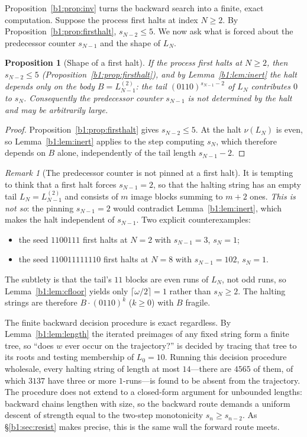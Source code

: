\documentclass[a4paper]{article}
\theoremstyle{plain}
\newtheorem{proposition}{Proposition}[subsection]
\theoremstyle{definition}
\theoremstyle{remark}
\newtheorem{remark}{Remark}[subsection]
\begin{document}
Proposition~\ref{b1:prop:inv} turns the backward search into a finite, exact computation. Suppose the process first halts at index $N\ge 2$. By Proposition~\ref{b1:prop:firsthalt}, $s_{N-2}\le 5$. We now ask what is forced about the predecessor counter $s_{N-1}$ and the shape of $L_N$.

\begin{proposition}[Shape of a first halt]\label{b1:prop:halt-corr}
If the process first halts at $N\ge 2$, then $s_{N-2}\le 5$ (Proposition~\ref{b1:prop:firsthalt}), and by Lemma~\ref{b1:lem:inert} the halt depends only on the body $B=L^{(2)}_{N-1}$: the tail $(0110)^{s_{N-1}-2}$ of $L_N$ contributes $0$ to $s_N$. Consequently the predecessor counter $s_{N-1}$ is not determined by the halt and may be arbitrarily large.
\end{proposition}
\begin{proof}
Proposition~\ref{b1:prop:firsthalt} gives $s_{N-2}\le 5$. At the halt $\nu(L_N)$ is even, so Lemma~\ref{b1:lem:inert} applies to the step computing $s_N$, which therefore depends on $B$ alone, independently of the tail length $s_{N-1}-2$.
\end{proof}

\begin{remark}[The predecessor counter is not pinned at a first halt]\label{b1:rem:rem-pinning}
It is tempting to think that a first halt forces $s_{N-1}=2$, so that the halting string has an empty tail $L_N=L^{(2)}_{N-1}$ and consists of $m$ image blocks summing to $m+2$ ones. \emph{This is not so}: the pinning $s_{N-1}=2$ would contradict Lemma~\ref{b1:lem:inert}, which makes the halt independent of $s_{N-1}$. Two explicit counterexamples:
\begin{itemize}
\item the seed $1100111$ first halts at $N=2$ with $s_{N-1}=3$, $s_N=1$;
\item the seed $110011111110$ first halts at $N=8$ with $s_{N-1}=102$, $s_N=1$.
\end{itemize}
The subtlety is that the tail's $11$ blocks are even runs of $L_N$, not odd runs, so Lemma~\ref{b1:lem:cfloor} yields only $\lceil\omega/2\rceil=1$ rather than $s_N\ge 2$. The halting strings are therefore $B\cdot(0110)^k$ ($k\ge 0$) with $B$ fragile.
\end{remark}

The finite backward decision procedure is exact regardless. By Lemma~\ref{b1:lem:length} the iterated preimages of any fixed string form a finite tree, so ``does $w$ ever occur on the trajectory?'' is decided by tracing that tree to its roots and testing membership of $L_0=10$. Running this decision procedure wholesale, every halting string of length at most $14$---there are $4565$ of them, of which $3137$ have three or more $1$-runs---is found to be absent from the trajectory. The procedure does not extend to a closed-form argument for unbounded lengths: backward chains lengthen with size, so the backward route demands a uniform descent of strength equal to the two-step monotonicity $s_n\ge s_{n-2}$. As \S\ref{b1:sec:resist} makes precise, this is the same wall the forward route meets.
\end{document}
